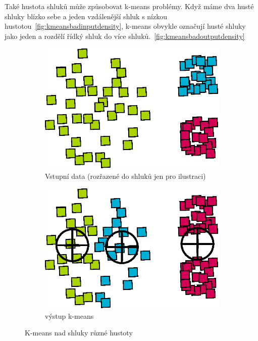 Také hustota shluků může způsobovat k-means problémy. Když máme dva husté shluky blízko sebe a jeden vzdálenější shluk s nízkou hustotou~\autoref{fig:kmeansbadinputdensity}, k-means obvykle označují husté shluky jako jeden a rozdělí řídký shluk do více shluků.~\autoref{fig:kmeansbadoutputdensity}
\begin{figure}[h]
\begin{subfigure}{.49\textwidth}
  \centering
  \includegraphics[width=.5\linewidth]{img/kmeans_badInputSampleDensity.eps}
  \caption{Vstupní data (rozřazené do shluků jen pro ilustraci)}
  \label{fig:kmeansbadinputdensity}
\end{subfigure}
\begin{subfigure}{.49\textwidth}
  \centering
  \includegraphics[width=.5\linewidth]{img/kmeans_badOutputSampleDensity.eps}
  \caption{výstup k-means}
  \label{fig:kmeansbadoutputdensity}
\end{subfigure}
\caption{K-means nad shluky různé hustoty}
\end{figure}

